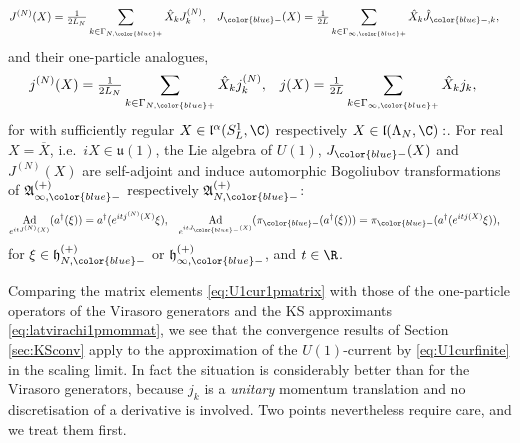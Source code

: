 \documentclass[a4paper, 11pt]{article}
\newcommand{\fA}{\mathfrak{A}}\newcommand{\cA}{\mathcal{A}}\newcommand{\dA}{\mathds{A}}\newcommand{\sA}{\mathscr{A}}
\newcommand{\fh}{\mathfrak{h}}
\newcommand{\fl}{\mathfrak{l}}\newcommand{\cl}{\mathcal{l}}
\newcommand{\fu}{\mathfrak{u}}
\DeclareMathOperator{\Ad}{Ad}
\DeclareMathOperator{\1}{\mathds{1}}
\begin{document}
\begin{align}
\label{eq:U1cursmeared}
J^{(N)}(X) & = \tfrac{1}{2L_{N}}\sum_{k\in\Gamma_{N,{\color{blue}+}}}\hat{X}_{k}J^{(N)}_{k}, & J_{{\color{blue}-}}(X) & = \tfrac{1}{2L}\sum_{k\in\Gamma_{\infty,{\color{blue}+}}}\hat{X}_{k}\hat{J}_{{\color{blue}-},k},
\end{align}
and their one-particle analogues,
\begin{align}
\label{eq:U1cur1psmeared}
j^{(N)}(X) & = \tfrac{1}{2L_{N}}\sum_{k\in\Gamma_{N,{\color{blue}+}}}\hat{X}_{k}j^{(N)}_{k}, & j(X) & = \tfrac{1}{2L}\sum_{k\in\Gamma_{\infty,{\color{blue}+}}}\hat{X}_{k}j_{k},
\end{align}
for with sufficiently regular $X\in\fl^{\alpha}(S^{1}_{L},\C)$ respectively $X\in\fl(\Lambda_{N},\C):$. For real $X = \overline{X}$, i.e.~$iX\in\fu(1)$, the Lie algebra of $U(1)$, $J_{{\color{blue}-}}(X)$ and $J^{(N)}(X)$ are self-adjoint and induce automorphic Bogoliubov transformations of $\fA^{(+)}_{\infty,{\color{blue}-}}$ respectively $\fA^{(+)}_{N,{\color{blue}-}}$:
\begin{align}
\label{eq:U1curBT}
\Ad_{e^{itJ^{(N)}(X)}}(a^{\dagger}(\xi)) & = a^{\dagger}(e^{itj^{(N)}(X)}\xi), & \Ad_{e^{itJ_{{\color{blue}-}}(X)}}(\pi_{{\color{blue}-}}(a^{\dagger}(\xi))) & = \pi_{{\color{blue}-}}(a^{\dagger}(e^{itj(X)}\xi)), 
\end{align}
for $\xi\in\fh^{(+)}_{N,{\color{blue}-}}$ or $\fh^{(+)}_{\infty,{\color{blue}-}}$, and $t\in\R$.

\bigskip

Comparing the matrix elements \eqref{eq:U1cur1pmatrix} with those of the one-particle operators of the Virasoro generators and the KS approximants \eqref{eq:latvirachi1pmommat}, we see that the convergence results of Section \ref{sec:KSconv} apply to the approximation of the $U(1)$-current by \eqref{eq:U1curfinite} in the scaling limit. In fact the situation is considerably better than for the Virasoro generators, because $j_{k}$ is a \emph{unitary} momentum translation and no discretisation of a derivative is involved. Two points nevertheless require care, and we treat them first.
\end{document}
